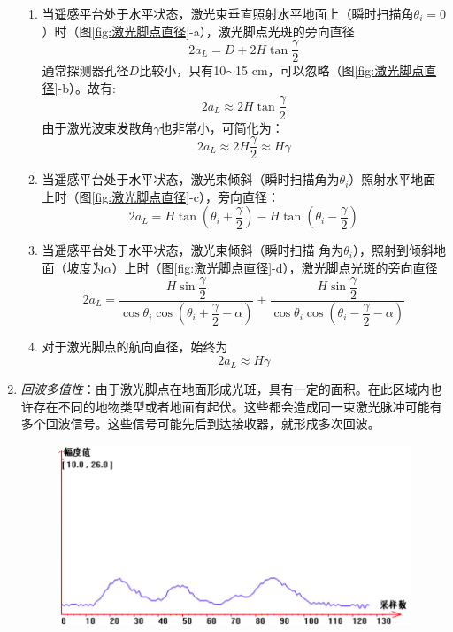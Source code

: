 \begin{enumerate}
		\begin{enumerate}
			\item 当遥感平台处于水平状态，激光束垂直照射水平地面上（瞬时扫描角$ θ_i=0 $）时（图\ref{fig:激光脚点直径}-a），激光脚点光斑的旁向直径
				\begin{equation}
				2a_L = D + 2H \tan \dfrac{\gamma}{2}
				\end{equation}
				通常探测器孔径$ D $比较小，只有10$ \sim $15 cm，可以忽略（图\ref{fig:激光脚点直径}-b）。故有:
				\begin{equation}
				2a_L \approx 2H \tan \dfrac{\gamma}{2}
				\end{equation}
				由于激光波束发散角$ γ $也非常小，可简化为：
				\begin{equation}
				2a_L \approx 2H \dfrac{\gamma}{2} \approx H \gamma
				\end{equation}
			\item 当遥感平台处于水平状态，激光束倾斜（瞬时扫描角为$ θ_i $）照射水平地面上时（图\ref{fig:激光脚点直径}-c），旁向直径：
				\begin{equation}
				2a_L = H \tan\left( \theta_i + \dfrac{\gamma}{2}\right)  - H \tan\left(\theta_i - \dfrac{\gamma}{2}\right)
				\end{equation}
			\item 当遥感平台处于水平状态，激光束倾斜（瞬时扫描 角为$ θ_i $），照射到倾斜地面（坡度为$ α $）上时（图\ref{fig:激光脚点直径}-d），激光脚点光斑的旁向直径
				\begin{equation}
				2a_L = \dfrac{H\sin\dfrac{\gamma}{2}}{\cos \theta_i \cos \left(\theta_i + \dfrac{\gamma}{2} - \alpha \right)}
				     + \dfrac{H\sin\dfrac{\gamma}{2}}{\cos \theta_i \cos \left(\theta_i - \dfrac{\gamma}{2} - \alpha \right)}
				\end{equation}
			\item 对于激光脚点的航向直径，始终为
				\begin{equation}
				2a_L \approx H \gamma
				\end{equation}
		\end{enumerate} %
	\item \textit{回波多值性}：由于激光脚点在地面形成光斑，具有一定的面积。在此区域内也许存在不同的地物类型或者地面有起伏。这些都会造成同一束激光脉冲可能有多个回波信号。这些信号可能先后到达接收器，就形成多次回波。
		\begin{figure}[htbp]
			\centering
			\includegraphics[width=0.7\linewidth]{figure/Chapter4/回波多值性}

\end{figure}
\end{enumerate}
